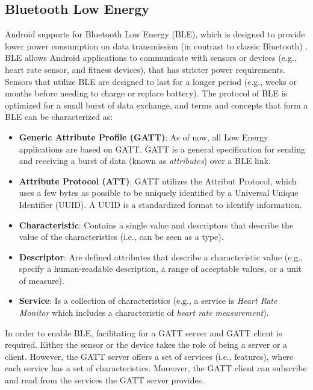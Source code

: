 \subsection{Bluetooth Low Energy}
Android supports for Bluetooth Low Energy (BLE), which is designed to provide lower power consumption on data transmission (in contrast to classic Bluetooth) \cite{bluetoothle}. BLE allows Android applications to communicate with sensors or devices (e.g., heart rate sensor, and fitness devices), that has stricter power requirements. Sensors that utilize BLE are designed to last for a longer period (e.g., weeks or months before needing to charge or replace battery). The protocol of BLE is optimized for a small burst of data exchange, and terms and concepts that form a BLE can be characterized as:
\begin{itemize}
    \item \textbf{Generic Attribute Profile (GATT)}: As of now, all Low Energy applications are based on GATT. GATT is a general specification for sending and receiving a burst of data (known as \textit{attributes}) over a BLE link. 
    \item \textbf{Attribute Protocol (ATT)}: GATT utilizes the Attribut Protocol, which uses a few bytes as possible to be uniquely identified by a Universal Unique Identifier (UUID). A UUID is a standardized format to identify information.
    \item \textbf{Characteristic}: Contains a single value and descriptors that describe the value of the characteristics (i.e., can be seen as a type). 
    \item \textbf{Descriptor}: Are defined attributes that describe a characteristic value (e.g., specify a human-readable description, a range of acceptable values, or a unit of measure).
    \item \textbf{Service}: Is a collection of characteristics (e.g., a service is \textit{Heart Rate Monitor} which includes a characteristic of \textit{heart rate measurement}).
\end{itemize}
In order to enable BLE, facilitating for a GATT server and GATT client is required. Either the sensor or the device takes the role of being a server or a client. However, the GATT server offers a set of services (i.e., features), where each service has a set of characteristics. Moreover, the GATT client can subscribe and read from the services the GATT server provides. 
